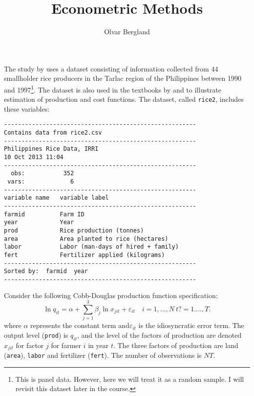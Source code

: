 \documentclass[a4paper,10pt]{lec_nmbu}
\title{Econometric Methods}
\author{Olvar Bergland}
\begin{document}
\maketitle


The study by \citet{ODO06EST} uses a dataset consisting of information collected
from 44 smallholder rice producers in the Tarlac region of the Philippines
between 1990 and 1997\footnote{This is panel data. However, here we will treat it as a
random sample. I will revisit this dataset later in the course.}. The dataset is
also used in the textbooks by \citet{COE05INT} and \citet{HIL18PRI} to
illustrate estimation of production and cost functions. The dataset, called
\texttt{rice2}, includes these variables:

\begin{footnotesize}
\begin{verbatim}
-------------------------------------------------------
Contains data from rice2.csv
-------------------------------------------------------
Philippines Rice Data, IRRI
10 Oct 2013 11:04
-------------------------------------------------------
  obs:           352
 vars:             6
-------------------------------------------------------
variable name   variable label
-------------------------------------------------------
farmid          Farm ID
year            Year
prod            Rice production (tonnes)
area            Area planted to rice (hectares)
labor           Labor (man-days of hired + family)
fert            Fertilizer applied (kilograms)
-------------------------------------------------------
Sorted by:  farmid  year
-------------------------------------------------------
\end{verbatim}
\end{footnotesize}

Consider the following Cobb-Douglas production function specification:
\begin{equation}
   \ln q_{it} = \alpha + \sum_{j=1}^{3} \beta_j \ln x_{jit} + \varepsilon_{it}
   \quad i=1,\ldots,N \ t?=1.\ldots,T.
   \label{fn:cd}
\end{equation}
where $\alpha$ represents the constant term and$\varepsilon_{it}$ is the idiosyncratic error term.
The output level (\texttt{prod}) is $q_{it}$, and the level of the factors of production are denoted
$x_{jit}$ for factor $j$ for farmer $i$ in year $t$. The three factors of
production are land (\texttt{area}), \texttt{labor} and fertilizer (\texttt{fert}).
The number of observations is $NT$.
\end{document}
